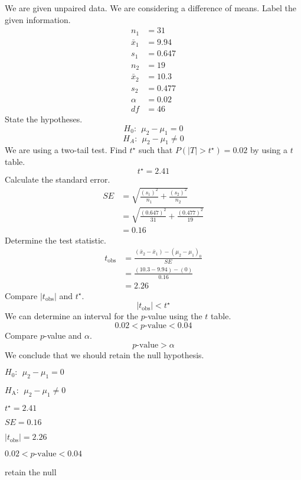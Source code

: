 \begin{solution}
We are given unpaired data. We are considering a difference of means.
Label the given information. \[
\begin{aligned}
n_1 &= 31 \\
\bar{x}_1 &= 9.94\\
s_1 &= 0.647\\
n_2 &= 19 \\
\bar{x}_2 &= 10.3\\
s_2 &= 0.477\\
\alpha &= 0.02 \\
df &= 46
\end{aligned}
\] State the hypotheses. \[H_0:~~\mu_2-\mu_1 = 0\]
\[H_A:~~\mu_2-\mu_1 \ne 0\] We are using a two-tail test. Find
\(t^{\star}\) such that \(P(|T|>t^{\star})=0.02\) by using a \(t\)
table. \[t^{\star} = 2.41\] Calculate the standard error. \[
\begin{aligned}
SE &= \sqrt{\frac{(s_1)^2}{n_1}+\frac{(s_2)^2}{n_2}} \\
&= \sqrt{\frac{(0.647)^2}{31}+\frac{(0.477)^2}{19}} \\
&= 0.16
\end{aligned}
\] Determine the test statistic. \[
\begin{aligned}
t_\text{obs} &= \frac{(\bar{x}_2-\bar{x}_1)-(\mu_2-\mu_1)_0}{SE} \\
&= \frac{(10.3-9.94)-(0)}{0.16} \\
&= 2.26
\end{aligned}
\] Compare \(|t_\text{obs}|\) and \(t^\star\).
\[|t_\text{obs}| < t^\star \] We can determine an interval for the
\(p\)-value using the \(t\) table. \[0.02 < p\text{-value} < 0.04\]
Compare \(p\)-value and \(\alpha\). \[p\text{-value} > \alpha \] We
conclude that we should retain the null hypothesis.
\begin{answerlist}
  \item \(H_0: ~~\mu_2-\mu_1=0\)
  \item \(H_\text{A}:~~ \mu_2-\mu_1\ne 0\)
  \item \(t^\star = 2.41\)
  \item \(SE = 0.16\)
  \item \(|t_\text{obs}| = 2.26\)
  \item \(0.02 < p\text{-value} < 0.04\)
  \item retain the null
\end{answerlist}
\end{solution}

